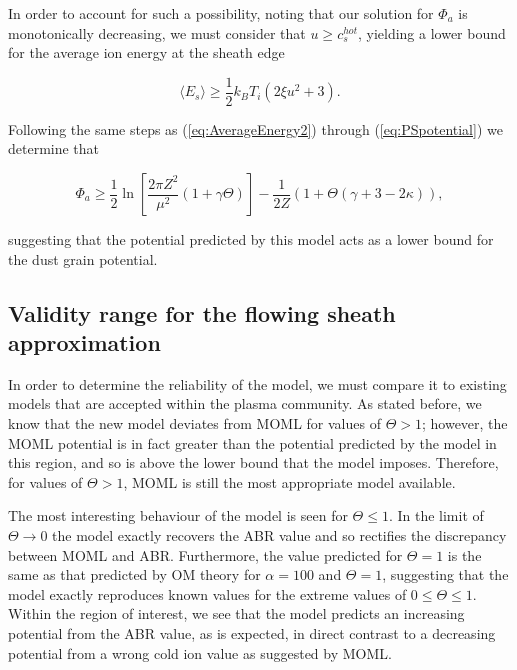 \documentclass{article}
\begin{document}
\medskip

In order to account for such a possibility, noting that our solution
for $\Phi_a$ is monotonically decreasing, we must consider that
$u \geq c_s^{hot}$, yielding a lower bound for the average ion energy at the sheath edge

\begin{equation}\label{eq:AverageEnergy}
\langle E_{s} \rangle \geq \frac{1}{2}k_B T_i \left(2\xi u^2 + 3\right).
\end{equation}

\medskip

Following the same steps as (\ref{eq:AverageEnergy2}) through (\ref{eq:PSpotential}) we determine that

\begin{equation}\label{eq:LowerBound}
\Phi_a \geq  \frac{1}{2}\ln{\left[\frac{2\pi Z^2}{\mu^2}(1 + \gamma \Theta)\right]} - \frac{1}{2Z}\left(1 + \Theta\left(\gamma + 3 -2\kappa\right)\right),
\end{equation}

\smallskip

\noindent suggesting that the potential predicted by this model acts as a lower bound for the dust grain potential.

\subsection{Validity range for the flowing sheath approximation}

\smallskip

In order to determine the reliability of the model, we must compare it to existing 
models that are accepted within the plasma community. As stated before, we know that 
the new model deviates from MOML for values of $\Theta > 1$; however, the MOML potential 
is in fact greater than the potential predicted by the model in this region, and so is above
the lower bound that the model imposes. Therefore, for values of $\Theta > 1$, MOML is still the most
appropriate model available. 

\medskip

The most interesting behaviour of the model is seen for $\Theta \leq 1$. In the limit of 
$\Theta \to 0$ the model exactly recovers the ABR value and so rectifies the discrepancy between
MOML and ABR. Furthermore, the value predicted for 
$\Theta = 1$ is the same as that predicted by OM theory for $\alpha = 100$ and $\Theta = 1$, suggesting 
that the model exactly reproduces known values for the extreme values of $0 \leq \Theta \leq 1$.
Within the region of interest, we see that the model predicts an 
increasing potential from the ABR value, as is expected, in direct contrast to a decreasing potential from a 
wrong cold ion value as suggested by MOML.
\end{document}
